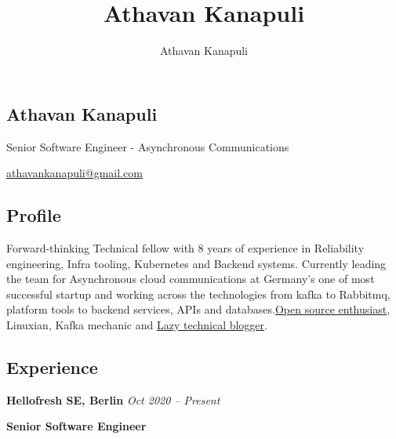 \documentclass[11pt, oneside]{article}
\title{Athavan Kanapuli}
\author{Athavan Kanapuli}
\begin{document}
\begin{center}
\section*{Athavan Kanapuli}
Senior Software Engineer - Asynchronous Communications

\href{athavankanapuli@gmail.com}{athavankanapuli@gmail.com}
\end{center}

\subsection*{Profile}

Forward-thinking Technical fellow with 8 years of experience in Reliability engineering, Infra tooling, Kubernetes and Backend systems. Currently leading the team for Asynchronous cloud communications at Germany's one of most successful startup and working across the technologies from kafka to Rabbitmq, platform tools to backend services, APIs and databases.\href{https://github.com/kanapuli}{Open source enthusiast}, Linuxian, Kafka mechanic and \href{https://medium.com/@athavankanapuli}{Lazy technical blogger}.

\medskip
\subsection*{Experience}

\textbf{Hellofresh SE, Berlin}
\hfill
\textit{Oct 2020 – Present}

\textbf{Senior Software Engineer}
\end{document}
